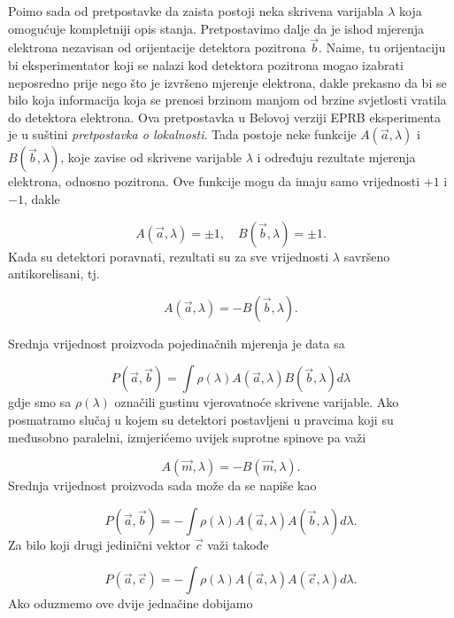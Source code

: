 Po\dj imo sada od pretpostavke da zaista postoji neka skrivena varijabla $\lambda$ koja omogućuje kompletniji opis stanja.
Pretpostavimo dalje da je ishod mjerenja elektrona nezavisan od orijentacije detektora pozitrona  $\vec{b}$. Naime, tu orijentaciju bi eksperimentator koji se nalazi kod detektora pozitrona mogao izabrati neposredno prije nego što je izvršeno mjerenje elektrona, dakle prekasno da bi se bilo koja informacija koja se prenosi brzinom manjom od brzine svjetlosti vratila do detektora elektrona. Ova pretpostavka u Belovoj verziji EPRB eksperimenta je u suštini {\it{pretpostavka o lokalnosti}}.
Tada postoje neke funkcije $A(\vec{a}, \lambda)$ i $B(\vec{b}, \lambda)$, koje zavise od skrivene varijable $\lambda$ i određuju rezultate mjerenja elektrona, odnosno pozitrona.
Ove funkcije mogu da imaju samo vrijednosti $+1$ i $-1$, dakle 

\begin{equation}
    A(\vec{a}, \lambda) = \pm 1, \quad B(\vec{b}, \lambda) = \pm 1.
\end{equation}
Kada su detektori poravnati, rezultati su za sve vrijednosti $\lambda$ savršeno antikorelisani, tj.

\begin{equation}
    A(\vec{a}, \lambda) = -B(\vec{b}, \lambda).
\end{equation}

Srednja vrijednost proizvoda pojedinačnih mjerenja je data sa

\begin{equation}
    P(\vec{a}, \vec{b}) = \int \rho (\lambda) A(\vec{a}, \lambda) B(\vec{b}, \lambda) d\lambda
\end{equation}
gdje smo sa $\rho (\lambda)$ označili gustinu vjerovatnoće skrivene varijable.
Ako posmatramo slučaj u kojem su detektori postavljeni u pravcima koji su međusobno paralelni, izmjerićemo uvijek suprotne spinove pa važi

\begin{equation}
    A(\vec{m}, \lambda) = - B(\vec{m}, \lambda).
\end{equation}
Srednja vrijednost proizvoda sada može da se napiše kao

\begin{equation}
    P(\vec{a}, \vec{b}) = - \int \rho (\lambda) A(\vec{a}, \lambda) A(\vec{b}, \lambda) d\lambda.
\end{equation}
Za bilo koji drugi jedinični vektor $\vec{c}$ važi takođe

\begin{equation}
    P(\vec{a}, \vec{c}) = - \int \rho (\lambda) A(\vec{a}, \lambda) A(\vec{c}, \lambda) d\lambda.
\end{equation}
Ako oduzmemo ove dvije jednačine dobijamo

